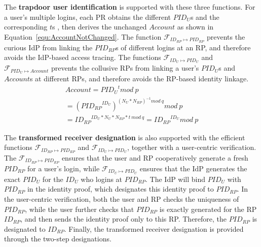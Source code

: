 The \textbf{trapdoor user identification} is supported with these three functions.
For a user's multiple logins, each PR obtains the different $PID_U$s and the corresponding $t$s , then derives the unchanged $Account$  as shown in Equation~\ref{equ:AccountNotChanged}.
The function $\mathcal{F}_{ID_{RP} \mapsto PID_{RP}}$ prevents the curious IdP from linking the $PID_{RP}$s of different logins at an RP, and therefore avoids  the  IdP-based access tracing.
The functions $\mathcal{F}_{ID_{U} \mapsto PID_{U}}$ and $\mathcal{F}_{PID_{U} \mapsto Account}$ prevents the collusive RPs from linking a user's $PID_U$s and $Account$s at different RPs, and therefore avoids the RP-based identity linkage.
 \begin{multline}\label{equ:AccountNotChanged}
   Account =  {PID_{U}}^{t} mod \ p  \\
   = {({PID_{RP}}^{ID_U})}^{{(N_U*N_{RP})^{-1} mod \ q}} mod \ p \\
   = {ID_{RP}} ^ {ID_U * N_U * N_{RP} *t\ mod\ q} = {ID_{RP}}^{ID_U} mod \ p
 \end{multline}

The \textbf{transformed receiver designation} is also supported with the efficient functions $\mathcal{F}_{ID_{RP} \mapsto PID_{RP}}$ and $\mathcal{F}_{ID_{U} \mapsto PID_{U}}$, together with  a user-centric verification.
The $\mathcal{F}_{ID_{RP} \mapsto PID_{RP}}$ ensures that the user and RP cooperatively generate a fresh $PID_{RP}$  for a user's login,
 while $\mathcal{F}_{ID_{U} \mapsto PID_{U}}$ ensures that the IdP generates the exact $PID_U$ for the $ID_U$ who logins at $PID_{RP}$.
The IdP will bind $PID_{U}$ with $PID_{RP}$ in the identity proof, which designates this identity proof to $PID_{RP}$.
In the user-centric verification,  both the user and RP checks the uniqueness of $PID_{RP}$, while the user further checks that $PID_{RP}$ is exactly generated for the RP $ID_{RP}$,  and then sends the identity proof  only  to this RP. Therefore, the $PID_{RP}$ is designated to $ID_{RP}$.
Finally, the transformed receiver designation is provided through the two-step designations.


